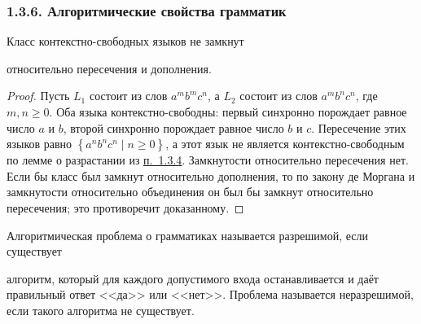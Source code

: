\documentclass[mathserif,12pt,aspectratio=169]{beamer}
\def\Set#1#2{\left\{ #1 \mid #2 \right\}}
\let\geq\geqslant
\def\DMref#1#2{{\color{blue}\underline{\hyperlink{#2}{#1}}}}
\begin{document}
\begin{frame}[t]
	\frametitle{1.3.6. Алгоритмические свойства грамматик }
	\setlength{\parskip}{1pt}
	\sloppy
	
	\begin{theorem}
		Класс контекстно-свободных языков не замкнут
		
		относительно пересечения и дополнения.
	\end{theorem}
	
	\begin{proof}
		\par\vspace{-4pt}
		Пусть $L_1$ состоит из слов $a^m b^m c^n$, а $L_2$ состоит из слов $a^m b^n c^n$, где $m,n\geq 0$. Оба языка контекстно-свободны: первый синхронно порождает равное число $a$ и $b$, второй синхронно порождает равное число $b$ и $c$. Пересечение этих языков равно $\Set{a^n b^n c^n}{n\geq 0}$, а этот язык не является контекстно-свободным по лемме о разрастании из \DMref{п.~1.3.4}{1.3.4.}. Замкнутости относительно пересечения нет. Если бы класс был замкнут относительно дополнения, то по закону де Моргана и замкнутости относительно объединения он был бы замкнут относительно пересечения; это противоречит доказанному.
	\end{proof}
	
	Алгоритмическая проблема о грамматиках называется разрешимой, если существует
	
	алгоритм, который для каждого допустимого входа останавливается и даёт правильный ответ <<да>> или <<нет>>. Проблема называется неразрешимой, если такого алгоритма не существует.
	
\end{frame}
\end{document}
